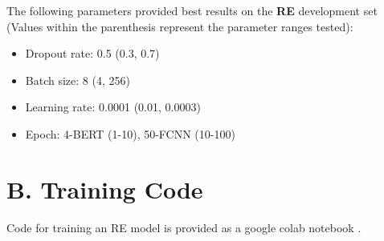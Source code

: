 \documentclass[letterpaper]{article}
\begin{document}
The following parameters provided best results on the \textbf{RE} development set (Values within the parenthesis represent the parameter ranges tested):
\begin{itemize}
        \item Dropout rate: 0.5 (0.3, 0.7)
        \item Batch size: 8 (4, 256)
        \item Learning rate: 0.0001 (0.01, 0.0003)
        \item Epoch: 4-BERT (1-10), 50-FCNN (10-100) 
\end{itemize}

\section{B. Training Code}
Code for training an RE model is provided as a google colab notebook \cite{re_training_code}. 

\newpage

\end{document}
